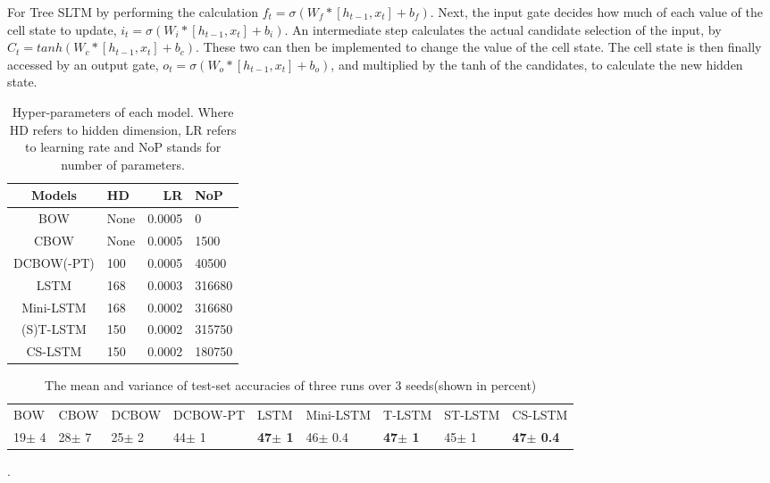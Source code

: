 For Tree SLTM by performing the calculation $f_t = \sigma(W_f * [h_{t-1}, x_t]
+ b_f)$. Next, the input gate decides how much of each value of the cell state
to update, $i_t = \sigma(W_i * [h_{t-1}, x_t] + b_i)$. An intermediate step
calculates the actual candidate selection of the input, by $C_t = tanh(W_c *
[h_{t-1}, x_t] + b_c)$. These two can then be implemented to change the value of
the cell state. The cell state is then finally accessed by an output gate, $o_t
= \sigma(W_o * [h_{t-1}, x_t] + b_o)$, and multiplied by the tanh of the
candidates, to calculate the new hidden state.














\begin{table}[t!]
    \begin{center}
    \begin{tabular}{|c|l|r|l|}
        \hline \bf Models & \bf HD & \bf LR &\bf NoP \\ \hline
        BOW & None & 0.0005 &0\\
        CBOW & None & 0.0005 & 1500\\
        DCBOW(-PT)& 100 & 0.0005 &40500\\
        LSTM&168 & 0.0003 &316680\\
        Mini-LSTM&168 & 0.0002&316680\\
        (S)T-LSTM&150 & 0.0002&315750\\
        CS-LSTM&150 & 0.0002& 180750\\
        \hline
    \end{tabular}
    \end{center}
    \label{tab:parameters}
    \caption{Hyper-parameters of each model. Where HD refers to hidden dimension, LR refers to learning rate and NoP stands for number of parameters.}
\end{table}

\begin{table*}[t]
    \centering
    \small
    \begin{tabular}{lllllllll}
    BOW  & CBOW & DCBOW & DCBOW-PT & LSTM & Mini-LSTM & T-LSTM & ST-LSTM &CS-LSTM \\
    19$\pm$ 4 & 28$\pm$ 7 & 25$\pm$ 2 & 44$\pm$ 1 & \textbf{47$\pm$ 1} & 46$\pm$ 0.4 & \textbf{47$\pm$ 1} & 45$\pm$ 1& \textbf{47$\pm$ 0.4}
    \end{tabular}
    \label{table: results-acc}
    \caption{The mean and variance of test-set accuracies of three runs over 3 seeds(shown in percent)}.
\end{table*}


